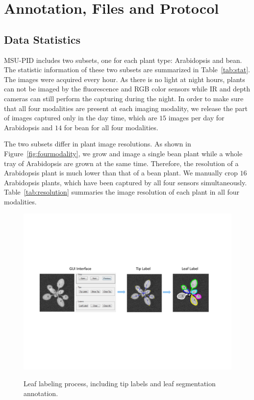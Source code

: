 \section{Annotation, Files and Protocol}
\subsection{Data Statistics}
MSU-PID includes two subsets, one for each plant type: Arabidopsis and bean.
The statistic information of these two subsets are summarized in Table~\ref{tab:stat}.
The images were acquired every hour.
As there is no light at night hours, plants can not be imaged by the fluorescence and RGB color sensors while IR and depth cameras can still perform the capturing during the night.
In order to make sure that all four modalities are present at each imaging modality, we release the part of images captured only in the day time, which are $15$ images per day for Arabidopsis and $14$ for bean for all four modalities.

The two subsets differ in plant image resolutions.
As shown in Figure~\ref{fig:fourmodality}, we grow and image a single bean plant while a whole tray of Arabidopsis are grown at the same time.
Therefore, the resolution of a Arabidopsis plant is much lower than that of a bean plant.
We manually crop $16$ Arabidopsis plants, which have been captured by all four sensors simultaneously.
Table~\ref{tab:resolution} summaries the image resolution of each plant in all four modalities.


\begin{figure}
\centering
\includegraphics[width=.90\textwidth]{Figures/labeling}\\
\caption{Leaf labeling process, including tip labels and leaf segmentation annotation.}
\label{fig:label}
\end{figure}

